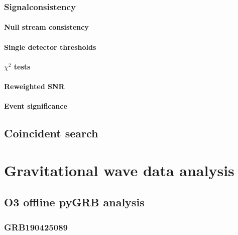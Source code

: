 \documentclass[binding=0.6cm, LaM]{sapthesis}
\begin{document}
\subsection{Signalconsistency}


\subsubsection{Null stream consistency}


\subsubsection{Single detector thresholds}



\subsubsection{$\chi^2$ tests}

\subsubsection{Reweighted SNR}

\subsubsection{Event significance}


\section{Coincident search}

\chapter{Gravitational wave data analysis}

\section{O3 offline pyGRB analysis}

\subsection{GRB190425089}
\end{document}
